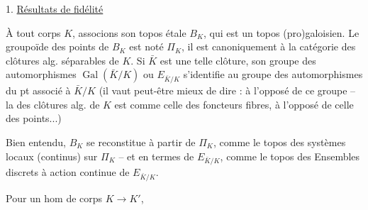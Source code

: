 1. \uline{Résultats de fidélité}

À tout corps $K$, associons son topos étale $B_K$, qui est un topos (pro)galoisien. Le groupoïde des points de $B_K$ est noté $\Pi_K$, il est  canoniquement à la catégorie des clôtures alg. séparables de $K$. Si $\bar K$ est une telle clôture, son groupe des automorphismes $\operatorname{Gal}(\bar K/K)$ ou $E_{\bar K/K}$ s'identifie au groupe des automorphismes du pt  associé à $\bar K/K$ (il vaut peut-être mieux de dire : à l'opposé de ce groupe --  la  des clôtures alg. de $K$ est comme celle des foncteurs fibres, à l'opposé de celle des points...)

Bien entendu, $B_K$ se reconstitue à partir de $\Pi_K$, comme le topos des systèmes locaux (continus) sur $\Pi_K$ -- et en termes de $E_{\bar K/K}$, comme le topos des Ensembles discrets à action continue de $E_{\bar K/K}$.

Pour un hom de corps $K\longrightarrow K'$,
